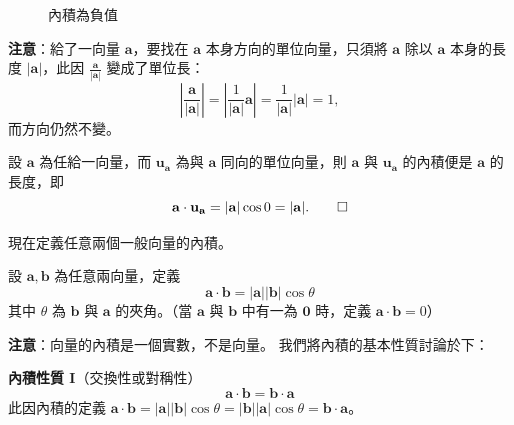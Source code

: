 \begin{figure}[H]
\begin{minipage}{0.48\textwidth}
\caption*{此時投影量 $|\mathbf{a}|\cos\theta < 0$，即 $\mathbf{a}\cdot\mathbf{u} < 0$}
\caption{內積為負值}
\label{fig:b3-fig3-36-2}
\end{minipage}
\end{figure}

\textbf{注意}：給了一向量 $\mathbf{a}$，要找在 $\mathbf{a}$ 本身方向的單位向量，只須將 $\mathbf{a}$ 除以 $\mathbf{a}$ 本身的長度 $|\mathbf{a}|$，此因 $\frac{\mathbf{a}}{|\mathbf{a}|}$ 變成了單位長：
\[ \left|\frac{\mathbf{a}}{|\mathbf{a}|}\right| = \left|\frac{1}{|\mathbf{a}|}\mathbf{a}\right| = \frac{1}{|\mathbf{a}|}|\mathbf{a}| = 1, \]
而方向仍然不變。

\begin{proposition}
設 $\mathbf{a}$ 為任給一向量，而 $\mathbf{u}_\mathbf{a}$ 為與 $\mathbf{a}$ 同向的單位向量，則 $\mathbf{a}$ 與 $\mathbf{u}_\mathbf{a}$ 的內積便是 $\mathbf{a}$ 的長度，即
\[ \mathbf{a}\cdot\mathbf{u}_\mathbf{a} = |\mathbf{a}|\cos 0 = |\mathbf{a}|. \qedhere \]
\end{proposition}

現在定義任意兩個一般向量的內積。
\begin{definition}
設 $\mathbf{a}, \mathbf{b}$ 為任意兩向量，定義
\[ \mathbf{a}\cdot\mathbf{b} = |\mathbf{a}||\mathbf{b}|\cos\theta \]
其中 $\theta$ 為 $\mathbf{b}$ 與 $\mathbf{a}$ 的夾角。（當 $\mathbf{a}$ 與 $\mathbf{b}$ 中有一為 $\mathbf{0}$ 時，定義 $\mathbf{a}\cdot\mathbf{b} = 0$）
\end{definition}

\textbf{注意}：向量的內積是一個實數，不是向量。
我們將內積的基本性質討論於下：

\textbf{內積性質 I}（交換性或對稱性）
\[ \mathbf{a}\cdot\mathbf{b} = \mathbf{b}\cdot\mathbf{a} \]
此因內積的定義 $\mathbf{a}\cdot\mathbf{b} = |\mathbf{a}||\mathbf{b}|\cos\theta = |\mathbf{b}||\mathbf{a}|\cos\theta = \mathbf{b}\cdot\mathbf{a}$。

